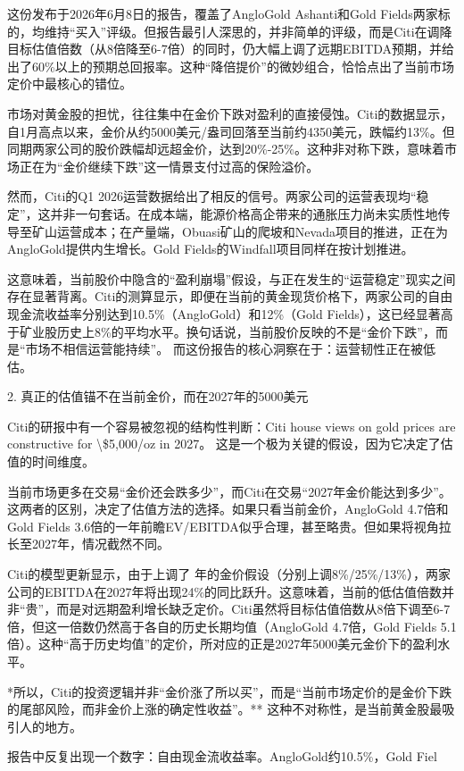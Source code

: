 \documentclass[11pt]{ctexart}
\begin{document}
这份发布于2026年6月8日的报告，覆盖了AngloGold Ashanti和Gold Fields两家标的，均维持“买入”评级。但报告最引人深思的，并非简单的评级，而是Citi在调降目标估值倍数（从8倍降至6-7倍）的同时，仍大幅上调了远期EBITDA预期，并给出了60\%以上的预期总回报率。这种“降倍提价”的微妙组合，恰恰点出了当前市场定价中最核心的错位。

市场对黄金股的担忧，往往集中在金价下跌对盈利的直接侵蚀。Citi的数据显示，自1月高点以来，金价从约5000美元/盎司回落至当前约4350美元，跌幅约13\%。但同期两家公司的股价跌幅却远超金价，达到20\%-25\%。这种非对称下跌，意味着市场正在为“金价继续下跌”这一情景支付过高的保险溢价。

然而，Citi的Q1 2026运营数据给出了相反的信号。两家公司的运营表现均“稳定”，这并非一句套话。在成本端，能源价格高企带来的通胀压力尚未实质性地传导至矿山运营成本；在产量端，Obuasi矿山的爬坡和Nevada项目的推进，正在为AngloGold提供内生增长。Gold Fields的Windfall项目同样在按计划推进。

这意味着，当前股价中隐含的“盈利崩塌”假设，与正在发生的“运营稳定”现实之间存在显著背离。Citi的测算显示，即便在当前的黄金现货价格下，两家公司的自由现金流收益率分别达到10.5\%（AngloGold）和12\%（Gold Fields），这已经显著高于矿业股历史上8\%的平均水平。换句话说，当前股价反映的不是“金价下跌”，而是“市场不相信运营能持续”。 而这份报告的核心洞察在于：运营韧性正在被低估。

2. 真正的估值锚不在当前金价，而在2027年的5000美元

Citi的研报中有一个容易被忽视的结构性判断：Citi house views on gold prices are constructive for \textbackslash{}\$5,000/oz in 2027。 这是一个极为关键的假设，因为它决定了估值的时间维度。

当前市场更多在交易“金价还会跌多少”，而Citi在交易“2027年金价能达到多少”。这两者的区别，决定了估值方法的选择。如果只看当前金价，AngloGold 4.7倍和Gold Fields 3.6倍的一年前瞻EV/EBITDA似乎合理，甚至略贵。但如果将视角拉长至2027年，情况截然不同。

Citi的模型更新显示，由于上调了 年的金价假设（分别上调8\%/25\%/13\%），两家公司的EBITDA在2027年将出现24\%的同比跃升。这意味着，当前的低估值倍数并非“贵”，而是对远期盈利增长缺乏定价。Citi虽然将目标估值倍数从8倍下调至6-7倍，但这一倍数仍然高于各自的历史长期均值（AngloGold 4.7倍，Gold Fields 5.1倍）。这种“高于历史均值”的定价，所对应的正是2027年5000美元金价下的盈利水平。

*所以，Citi的投资逻辑并非“金价涨了所以买”，而是“当前市场定价的是金价下跌的尾部风险，而非金价上涨的确定性收益”。** 这种不对称性，是当前黄金股最吸引人的地方。

报告中反复出现一个数字：自由现金流收益率。AngloGold约10.5\%，Gold Fiel
\end{document}
